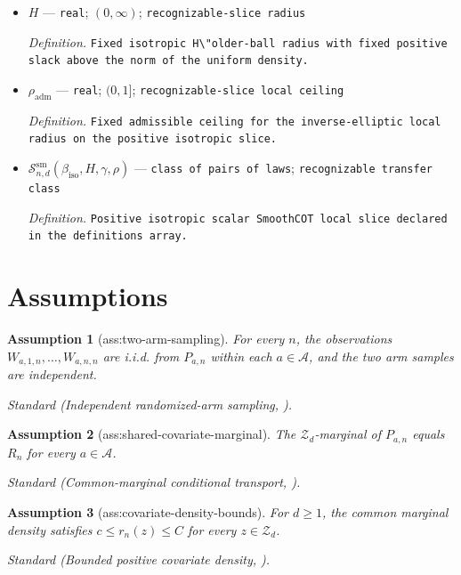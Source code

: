 \documentclass{article}
\newtheorem{assumption}{Assumption}
\begin{document}
\begin{itemize}
  \item \(H\) --- \texttt{real}; \((0,\infty)\); \texttt{recognizable-\allowbreak{}slice radius}
  \par\smallskip\noindent\emph{Definition.} \texttt{Fixed isotropic H\textbackslash{}\allowbreak{}"older-\allowbreak{}ball radius with fixed positive slack above the norm of the uniform density.}
  \item \(\rho_{\mathrm{adm}}\) --- \texttt{real}; \((0,1]\); \texttt{recognizable-\allowbreak{}slice local ceiling}
  \par\smallskip\noindent\emph{Definition.} \texttt{Fixed admissible ceiling for the inverse-\allowbreak{}elliptic local radius on the positive isotropic slice.}
  \item \(\mathcal S^{\mathrm{sm}}_{n,d}(\beta_{\mathrm{iso}},H,\gamma,\rho)\) --- \texttt{class of pairs of laws}; \texttt{recognizable transfer class}
  \par\smallskip\noindent\emph{Definition.} \texttt{Positive isotropic scalar SmoothCOT local slice declared in the definitions array.}
\end{itemize}

\section{Assumptions}

\begin{assumption}[ass:two-arm-sampling]\label{ass:two-arm-sampling}
For every \(n\), the observations \(W_{a,1,n},\ldots,W_{a,n,n}\) are i.i.d. from \(P_{a,n}\) within each \(a\in\mathcal A\), and the two arm samples are independent.
\par\smallskip\noindent\emph{Standard} (Independent randomized-arm sampling, \cite{LinGaoBlanchetGlynn2026SmoothCOT}).
\end{assumption}

\begin{assumption}[ass:shared-covariate-marginal]\label{ass:shared-covariate-marginal}
The \(\mathcal Z_d\)-marginal of \(P_{a,n}\) equals \(R_n\) for every \(a\in\mathcal A\).
\par\smallskip\noindent\emph{Standard} (Common-marginal conditional transport, \cite{LinGaoBlanchetGlynn2026SmoothCOT}).
\end{assumption}

\begin{assumption}[ass:covariate-density-bounds]\label{ass:covariate-density-bounds}
For \(d\ge1\), the common marginal density satisfies \(c\le r_n(z)\le C\) for every \(z\in\mathcal Z_d\).
\par\smallskip\noindent\emph{Standard} (Bounded positive covariate density, \cite{LinGaoBlanchetGlynn2026SmoothCOT}).
\end{assumption}
\end{document}
